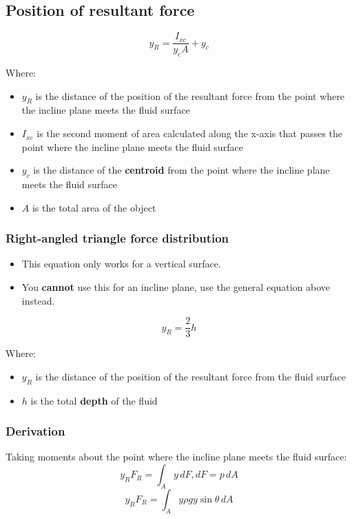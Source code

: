 \documentclass[11pt]{article}
\begin{document}
\subsection{Position of resultant force}
\label{sec:orgb72b160}
\[y_R = \frac{I_{xc}}{y_c A} + y_c\]

Where:
\begin{itemize}
\item \(y_R\) is the distance of the position of the resultant force from the point where the incline plane meets the fluid surface
\item \(I_{xc}\) is the second moment of area calculated along the x-axis that passes the point where the incline plane meets the fluid surface
\item \(y_c\) is the distance of the \textbf{centroid} from the point where the incline plane meets the fluid surface
\item \(A\) is the total area of the object
\end{itemize}

\subsubsection{Right-angled triangle force distribution}
\label{sec:org8dc69b1}
\begin{itemize}
\item This equation only works for a vertical surface.
\item You \textbf{cannot} use this for an incline plane, use the general equation above instead.
\end{itemize}

\[y_R = \frac{2}{3} h\]

Where:
\begin{itemize}
\item \(y_R\) is the distance of the position of the resultant force from the fluid surface
\item \(h\) is the total \textbf{depth} of the fluid
\end{itemize}

\newpage

\subsubsection{Derivation}
\label{sec:orgd5cae48}
Taking moments about the point where the incline plane meets the fluid surface:
\[y_R F_R = \int_A y \, dF, dF = p \, dA\]
\[y_R F_R = \int_A y \rho g y \sin \theta \, dA\]
\end{document}
